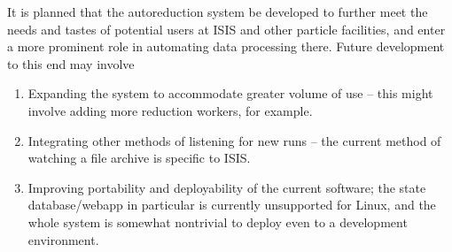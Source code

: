 \documentclass[twocolumn]{article}
\providecommand{\tightlist}{%
  \setlength{\itemsep}{0pt}\setlength{\parskip}{0pt}}
\begin{document}
It is planned that the autoreduction system be developed to further meet
the needs and tastes of potential users at ISIS and other particle
facilities, and enter a more prominent role in automating data
processing there. Future development to this end may involve

\begin{enumerate}
\def\labelenumi{\arabic{enumi}.}
\tightlist
\item
  Expanding the system to accommodate greater volume of use -- this
  might involve adding more reduction workers, for example.
\item
  Integrating other methods of listening for new runs -- the current
  method of watching a file archive is specific to ISIS.
\item
  Improving portability and deployability of the current software; the
  state database/webapp in particular is currently unsupported for
  Linux, and the whole system is somewhat nontrivial to deploy even to a
  development environment.
\end{enumerate}
\end{document}
